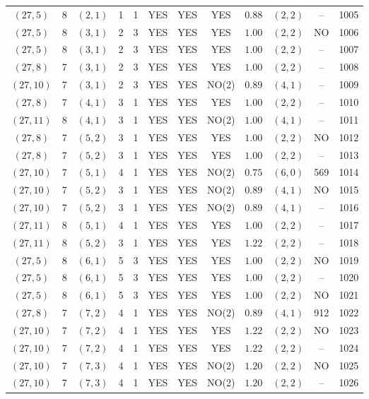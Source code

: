 \begin{longtable}{|c|c|c|c|c|c|c|c|c|c|c|c|}
$(27,5)$ & 8 & $(2,1)$ & 1 & 1 & YES & YES & YES & $0.88$ & $(2,2)$ & -- & 1005\\
$(27,5)$ & 8 & $(3,1)$ & 2 & 3 & YES & YES & YES & $1.00$ & $(2,2)$ & NO & 1006\\
$(27,5)$ & 8 & $(3,1)$ & 2 & 3 & YES & YES & YES & $1.00$ & $(2,2)$ & -- & 1007\\
$(27,8)$ & 7 & $(3,1)$ & 2 & 3 & YES & YES & YES & $1.00$ & $(2,2)$ & -- & 1008\\
$(27,10)$ & 7 & $(3,1)$ & 2 & 3 & YES & YES & NO(2) & $0.89$ & $(4,1)$ & -- & 1009\\
$(27,8)$ & 7 & $(4,1)$ & 3 & 1 & YES & YES & YES & $1.00$ & $(2,2)$ & -- & 1010\\
$(27,11)$ & 8 & $(4,1)$ & 3 & 1 & YES & YES & NO(2) & $1.00$ & $(4,1)$ & -- & 1011\\
$(27,8)$ & 7 & $(5,2)$ & 3 & 1 & YES & YES & YES & $1.00$ & $(2,2)$ & NO & 1012\\
$(27,8)$ & 7 & $(5,2)$ & 3 & 1 & YES & YES & YES & $1.00$ & $(2,2)$ & -- & 1013\\
$(27,10)$ & 7 & $(5,1)$ & 4 & 1 & YES & YES & NO(2) & $0.75$ & $(6,0)$ & 569 & 1014\\
$(27,10)$ & 7 & $(5,2)$ & 3 & 1 & YES & YES & NO(2) & $0.89$ & $(4,1)$ & NO & 1015\\
$(27,10)$ & 7 & $(5,2)$ & 3 & 1 & YES & YES & NO(2) & $0.89$ & $(4,1)$ & -- & 1016\\
$(27,11)$ & 8 & $(5,1)$ & 4 & 1 & YES & YES & YES & $1.00$ & $(2,2)$ & -- & 1017\\
$(27,11)$ & 8 & $(5,2)$ & 3 & 1 & YES & YES & YES & $1.22$ & $(2,2)$ & -- & 1018\\
$(27,5)$ & 8 & $(6,1)$ & 5 & 3 & YES & YES & YES & $1.00$ & $(2,2)$ & NO & 1019\\
$(27,5)$ & 8 & $(6,1)$ & 5 & 3 & YES & YES & YES & $1.00$ & $(2,2)$ & -- & 1020\\
$(27,5)$ & 8 & $(6,1)$ & 5 & 3 & YES & YES & YES & $1.00$ & $(2,2)$ & NO & 1021\\
$(27,8)$ & 7 & $(7,2)$ & 4 & 1 & YES & YES & NO(2) & $0.89$ & $(4,1)$ & 912 & 1022\\
$(27,10)$ & 7 & $(7,2)$ & 4 & 1 & YES & YES & YES & $1.22$ & $(2,2)$ & NO & 1023\\
$(27,10)$ & 7 & $(7,2)$ & 4 & 1 & YES & YES & YES & $1.22$ & $(2,2)$ & -- & 1024\\
$(27,10)$ & 7 & $(7,3)$ & 4 & 1 & YES & YES & NO(2) & $1.20$ & $(2,2)$ & NO & 1025\\
$(27,10)$ & 7 & $(7,3)$ & 4 & 1 & YES & YES & NO(2) & $1.20$ & $(2,2)$ & -- & 1026\\

\end{longtable}
